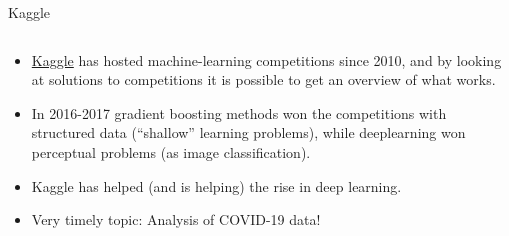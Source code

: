 \documentclass[10pt,ignorenonframetext,]{beamer}
\providecommand{\tightlist}{%
  \setlength{\itemsep}{0pt}\setlength{\parskip}{0pt}}
\begin{document}
\begin{frame}

\begin{block}{Kaggle}

\(~\)

\begin{itemize}
\tightlist
\item
  \href{https://www.kaggle.com/}{Kaggle} has hosted machine-learning
  competitions since 2010, and by looking at solutions to competitions
  it is possible to get an overview of what works.
\end{itemize}

\vspace{2mm}

\begin{itemize}
\tightlist
\item
  In 2016-2017 gradient boosting methods won the competitions with
  structured data (``shallow'' learning problems), while deeplearning
  won perceptual problems (as image classification).
\end{itemize}

\vspace{2mm}

\begin{itemize}
\tightlist
\item
  Kaggle has helped (and is helping) the rise in deep learning.
\end{itemize}

\vspace{2mm}

\begin{itemize}
\tightlist
\item
  Very timely topic: Analysis of COVID-19 data!
\end{itemize}

\end{block}

\end{frame}
\end{document}
